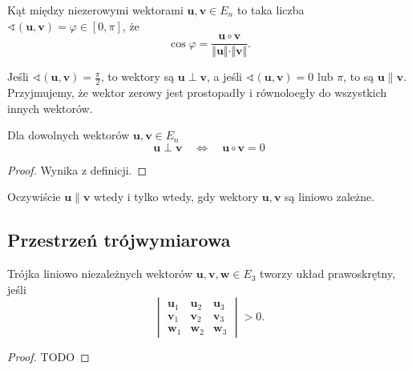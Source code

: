 \begin{definition}
    Kąt między niezerowymi wektorami $\mathbf{u}, \mathbf{v} \in E_n$ to taka liczba $\sphericalangle(\mathbf{u}, \mathbf{v}) = \varphi \in [0, \pi]$, że
    \[ \cos\varphi = \frac{\mathbf{u} \circ \mathbf{v}}{\Vert \mathbf{u} \Vert \cdot \Vert \mathbf{v} \Vert}. \]
\end{definition}

Jeśli $\sphericalangle(\mathbf{u}, \mathbf{v}) = \frac{\pi}{2}$, to wektory są  $\mathbf{u} \perp \mathbf{v}$, a jeśli $\sphericalangle(\mathbf{u}, \mathbf{v}) = 0$ lub $\pi$, to są  $\mathbf{u} \parallel \mathbf{v}$. Przyjmujemy, że wektor zerowy jest prostopadły i równoloegły do wszystkich innych wektorów.

\begin{fact}
    Dla dowolnych wektorów $\mathbf{u}, \mathbf{v} \in E_n$
    \[ \mathbf{u} \perp \mathbf{v} \quad \iff \quad \mathbf{u} \circ \mathbf{v} = 0 \]
\end{fact}
\begin{proof}
    Wynika z definicji.
\end{proof}

Oczywiście $\mathbf{u} \parallel \mathbf{v}$ wtedy i tylko wtedy, gdy wektory $\mathbf{u}, \mathbf{v}$ są liniowo zależne.

\subsection{Przestrzeń trójwymiarowa}
\begin{fact}
    Trójka liniowo niezależnych wektorów $\mathbf{u}, \mathbf{v}, \mathbf{w} \in E_3$ tworzy układ prawoskrętny, jeśli
    \[ \begin{vmatrix}
        \mathbf{u}_1 & \mathbf{u}_2 & \mathbf{u}_3 \\
        \mathbf{v}_1 & \mathbf{v}_2 & \mathbf{v}_3 \\
        \mathbf{w}_1 & \mathbf{w}_2 & \mathbf{w}_3
    \end{vmatrix} > 0. \]
\end{fact}
\begin{proof}
    TODO
\end{proof}

